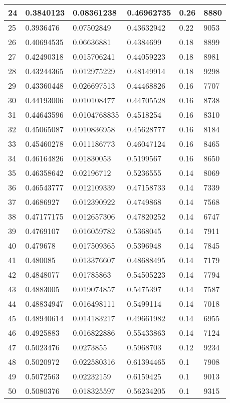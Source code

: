\begin{longtable}{|l|l|l|l|l|l|}
24 & 0.3840123 & 0.08361238 & 0.46962735 & 0.26 & 8880 \\ \hline 
25 & 0.3936476 & 0.07502849 & 0.43632942 & 0.22 & 9053 \\ \hline 
26 & 0.40694535 & 0.06636881 & 0.4384699 & 0.18 & 8899 \\ \hline 
27 & 0.42490318 & 0.015706241 & 0.44059223 & 0.18 & 8981 \\ \hline 
28 & 0.43244365 & 0.012975229 & 0.48149914 & 0.18 & 9298 \\ \hline 
29 & 0.43360448 & 0.026697513 & 0.44468826 & 0.16 & 7707 \\ \hline 
30 & 0.44193006 & 0.010108477 & 0.44705528 & 0.16 & 8738 \\ \hline 
31 & 0.44643596 & 0.0104768835 & 0.4518254 & 0.16 & 8310 \\ \hline 
32 & 0.45065087 & 0.010836958 & 0.45628777 & 0.16 & 8184 \\ \hline 
33 & 0.45460278 & 0.011186773 & 0.46047124 & 0.16 & 8465 \\ \hline 
34 & 0.46164826 & 0.01830053 & 0.5199567 & 0.16 & 8650 \\ \hline 
35 & 0.46358642 & 0.02196712 & 0.5236555 & 0.14 & 8069 \\ \hline 
36 & 0.46543777 & 0.012109339 & 0.47158733 & 0.14 & 7339 \\ \hline 
37 & 0.4686927 & 0.012390922 & 0.4749868 & 0.14 & 7568 \\ \hline 
38 & 0.47177175 & 0.012657306 & 0.47820252 & 0.14 & 6747 \\ \hline 
39 & 0.4769107 & 0.016059782 & 0.5368045 & 0.14 & 7911 \\ \hline 
40 & 0.479678 & 0.017509365 & 0.5396948 & 0.14 & 7845 \\ \hline 
41 & 0.480085 & 0.013376607 & 0.48688495 & 0.14 & 7179 \\ \hline 
42 & 0.4848077 & 0.01785863 & 0.54505223 & 0.14 & 7794 \\ \hline 
43 & 0.4883005 & 0.019074857 & 0.5475397 & 0.14 & 7587 \\ \hline 
44 & 0.48834947 & 0.016498111 & 0.5499114 & 0.14 & 7018 \\ \hline 
45 & 0.48940614 & 0.014183217 & 0.49661982 & 0.14 & 6955 \\ \hline 
46 & 0.4925883 & 0.016822886 & 0.55433863 & 0.14 & 7124 \\ \hline 
47 & 0.5023476 & 0.0273855 & 0.5968703 & 0.12 & 9234 \\ \hline 
48 & 0.5020972 & 0.022580316 & 0.61394465 & 0.1 & 7908 \\ \hline 
49 & 0.5072563 & 0.02232159 & 0.6159425 & 0.1 & 9013 \\ \hline 
50 & 0.5080376 & 0.018325597 & 0.56234205 & 0.1 & 9315 \\ \hline 
\end{longtable}
